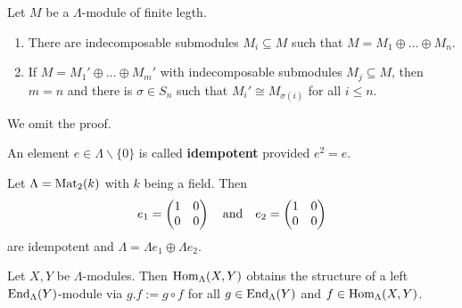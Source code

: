 \begin{theorem}\label{1.4.3}
Let $M$ be a $\Lambda$-module of finite legth.
\begin{enumerate}
\item There are indecomposable submodules $M_i\subseteq M$ such that $M=M_1\oplus \dots \oplus M_n$.
\item If $M=M_1'\oplus \dots \oplus M_m'$ with indecomposable submodules $M_j\subseteq M$, then $m=n$ and there is $\sigma\in S_n$ such that $M_i'\cong M_{\sigma(i)}$ for all $i\le n$.
\end{enumerate}
\end{theorem}


We omit the proof.


\begin{definition}
An element $e\in \Lambda\smallsetminus\{0\}$ is called \textbf{idempotent} provided $e^2=e$.
\end{definition}


\begin{example}
Let $\Lambda=\operatorname{Mat}_2(k)$ with $k$ being a field. Then
\[
e_1 =
\begin{pmatrix}
1 & 0 \\
0 & 0
\end{pmatrix}
\quad\text{and}\quad
e_2 =
\begin{pmatrix}
1 & 0 \\
0 & 0
\end{pmatrix}
\]
are idempotent and $\Lambda=\Lambda e_1\oplus \Lambda e_2$.
\end{example}


\begin{remark}
Let $X,Y$ be $\Lambda$-modules. Then $\operatorname{Hom}_\Lambda(X,Y)$ obtains the structure of a left $\operatorname{End}_\Lambda(Y)$-module via $g.f := g \circ f$ for all $g\in \operatorname{End}_\Lambda(Y)$ and $f\in \operatorname{Hom}_\Lambda(X,Y)$.
\end{remark}

